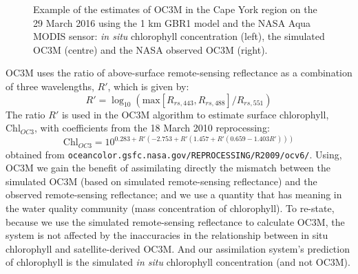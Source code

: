 \begin{figure}[thb]
\begin{center} 
\caption{Example of the estimates of OC3M in the Cape York region on the 29 March 2016 using the 1
km GBR1 model and the NASA Aqua MODIS sensor: \textit{in situ} chlorophyll concentration (left), the
simulated OC3M (centre) and the NASA observed OC3M (right).}
\label{fig:OC3M}
\end{center}
\end{figure}

OC3M uses the ratio of above-surface remote-sensing reflectance as a combination of three
wavelengths, $R'$, which is given by:
\begin{equation} R' = \log_{10} \left( \mathrm{max} \left[ R_{rs,443}, R_{rs,488} \right] /
R_{rs,551} \right)
\end{equation} The ratio $R'$ is used in the OC3M algorithm to estimate surface chlorophyll,
$\mathrm{Chl}_{OC3}$, with coefficients from the 18 March 2010 reprocessing:
\begin{equation} \mathrm{Chl}_{OC3} = 10^{0.283 + R' \left(-2.753 + R' \left( 1.457 + R' \left(0.659
- 1.403 R' \right) \right) \right)}
\end{equation} obtained from \texttt{oceancolor.gsfc.nasa.gov/REPROCESSING/R2009/ocv6/}. Using, OC3M
we gain the benefit of assimilating directly the mismatch between the simulated OC3M (based on
simulated remote-sensing reflectance) and the observed remote-sensing reflectance; and we use a
quantity that has meaning in the water quality community (mass concentration of chlorophyll). To
re-state, because we use the simulated remote-sensing reflectance to calculate OC3M, the system is
not affected by the inaccuracies in the relationship between in situ chlorophyll and
satellite-derived OC3M. And our assimilation system's prediction of chlorophyll is the simulated
\textit{in situ} chlorophyll concentration (and not OC3M).

